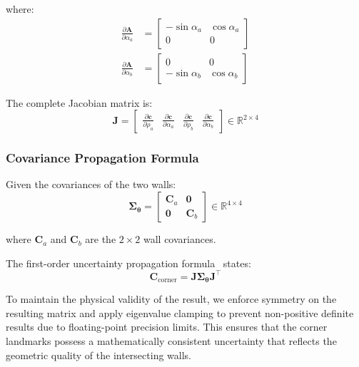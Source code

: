 \documentclass[11pt]{article}
\begin{document}
where:
\begin{align}
	\frac{\partial \mathbf{A}}{\partial \alpha_a} &=
	\begin{bmatrix}
		-\sin \alpha_a & \cos \alpha_a \\
		0 & 0
	\end{bmatrix} \\
	\frac{\partial \mathbf{A}}{\partial \alpha_b} &=
	\begin{bmatrix}
		0 & 0 \\
		-\sin \alpha_b & \cos \alpha_b
	\end{bmatrix}
\end{align}

The complete Jacobian matrix is:
\begin{equation}
	\mathbf{J} =
	\begin{bmatrix}
		\frac{\partial \mathbf{c}}{\partial \rho_a} &
		\frac{\partial \mathbf{c}}{\partial \alpha_a} &
		\frac{\partial \mathbf{c}}{\partial \rho_b} &
		\frac{\partial \mathbf{c}}{\partial \alpha_b}
	\end{bmatrix}
	\in \mathbb{R}^{2 \times 4}
\end{equation}

\subsubsection{Covariance Propagation Formula}

Given the covariances of the two walls:
\begin{equation}
	\boldsymbol{\Sigma}_{\boldsymbol{\theta}} =
	\begin{bmatrix}
		\mathbf{C}_a & \mathbf{0} \\
		\mathbf{0} & \mathbf{C}_b
	\end{bmatrix}
	\in \mathbb{R}^{4 \times 4}
\end{equation}

where $\mathbf{C}_a$ and $\mathbf{C}_b$ are the $2 \times 2$ wall covariances.

The first-order uncertainty propagation formula~\cite{thrun2005probabilistic} states:
\begin{equation}
	\mathbf{C}_{\text{corner}} = \mathbf{J} \boldsymbol{\Sigma}_{\boldsymbol{\theta}} \mathbf{J}^\top
	\label{eq:corner_propagation}
\end{equation}


To maintain the physical validity of the result, we enforce symmetry on the resulting matrix and apply eigenvalue clamping to prevent non-positive definite results due to floating-point precision limits. This ensures that the corner landmarks possess a mathematically consistent uncertainty that reflects the geometric quality of the intersecting walls.
\end{document}
